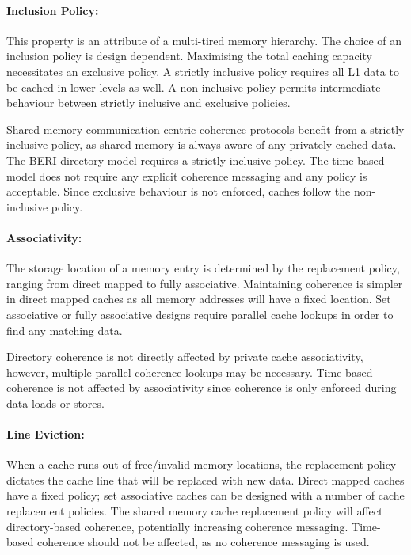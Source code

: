 	\paragraph{Inclusion Policy:} This property is an attribute of a multi-tired memory hierarchy. The choice of an inclusion policy is design dependent. Maximising the total caching capacity necessitates an exclusive policy. A strictly inclusive policy requires all L1 data to be cached in lower levels as well. A non-inclusive policy permits intermediate behaviour between strictly inclusive and exclusive policies. 
	
	Shared memory communication centric coherence protocols benefit from a strictly inclusive policy, as shared memory is always aware of any privately cached data. The BERI directory model requires a strictly inclusive policy. 
	The time-based model does not require any explicit coherence messaging and any policy is acceptable. Since exclusive behaviour is not enforced, caches follow the non-inclusive policy.
	
	\paragraph{Associativity:} The storage location of a memory entry is determined by the replacement policy, ranging from direct mapped to fully associative. Maintaining coherence is simpler in direct mapped caches as all memory addresses will have a fixed location. Set associative or fully associative designs require parallel cache lookups in order to find any matching data. 
	
	Directory coherence is not directly affected by private cache associativity, however, multiple parallel coherence lookups may be necessary. Time-based coherence is not affected by associativity since coherence is only enforced during data loads or stores.
	
	\paragraph{Line Eviction:} When a cache runs out of free/invalid memory locations, the replacement policy dictates the cache line that will be replaced with new data. Direct mapped caches have a fixed policy; set associative caches can be designed with a number of cache replacement policies. The shared memory cache replacement policy will affect directory-based coherence, potentially increasing coherence messaging. Time-based coherence should not be affected, as no coherence messaging is used.
	

